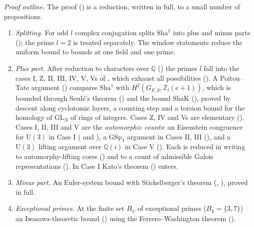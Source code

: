\documentclass[10pt]{amsart}
\theoremstyle{definition}
\theoremstyle{remark}
\newcommand{\Z}{\mathbb Z}
\newcommand{\Q}{\mathbb Q}
\begin{document}
\emph{Proof outline.} The proof (\cite[\S\S\ref{A-i5:ssec-assembly}--\ref{A-i5:ssec-proof}]{Annex})
is a reduction, written in full, to a small number of propositions.
\begin{enumerate}
\item \emph{Splitting.} For odd $l$ complex conjugation splits
$\mathrm{Sha}^1$ into plus and minus parts
(\cite[Lemma~\ref{A-i5:lem-split}]{Annex}); the prime $l=2$ is treated
separately. The window statements reduce the uniform bound to bounds at one
field and one prime.
\item \emph{Plus part.} After reduction to characters over $\Q$
(\cite[\S\ref{A-i5:ssec-red}]{Annex}) the primes $l$ fall into the cases I,
Z, II, III, IV, V, Vs of \cite[Definition~\ref{A-i5:def-cases}]{Annex},
which exhaust all possibilities
(\cite[Lemma~\ref{A-i5:lem-hostarith}]{Annex}). A Poitou--Tate argument
(\cite[Proposition~\ref{A-i5:prop-shaleV}]{Annex}) compares $\mathrm{Sha}^1$
with $H^2(G_{F,S},\Z_l(e+1))$, which is bounded through Soul\'e's theorem
(\cite[Theorem~\ref{A-i5:thm-soule}]{Annex}) and the bound
$\mathrm{ShaK}$ (\cite[Proposition~\ref{A-i5:prop-shak}]{Annex}), proved by
descent along cyclotomic layers, a counting step and a torsion bound for
the homology of $\mathrm{GL}_N$ of rings of integers. Cases Z, IV and Vs
are elementary (\cite[Propositions~\ref{A-i5:prop-countZ}, \ref{A-i5:prop-countIV},
\ref{A-i5:prop-countVs}]{Annex}). Cases I, II, III and V are the
\emph{automorphic counts}: an Eisenstein congruence for $\mathrm U(3)$ in
Case I (\cite[Theorem~\ref{A-i5:prop-corg}]{Annex} and
\cite[Proposition~\ref{A-i5:prop-countI}]{Annex}), a $\mathrm{GSp}_4$
argument in Cases II, III (\cite[Proposition~\ref{A-i5:prop-c23}]{Annex}), and
a $\mathrm U(3)$ lifting argument over $\Q(i)$ in Case V
(\cite[Proposition~\ref{A-i5:prop-c5}]{Annex}). Each is reduced in writing to
automorphy-lifting cores (\cite[\S\S\ref{A-i5:x5-ssec}, \ref{A-i5:x5-ssec-arch}]{Annex})
and to a count of admissible Galois representations
(\cite[Proposition~\ref{A-i5:x-prop:u3count}]{Annex}). In Case I Kato's
theorem (\cite[Theorem~\ref{A-i5:x-thm:kato}]{Annex}) enters.
\item \emph{Minus part.} An Euler-system bound with Stickelberger's
theorem (\cite[Theorem~\ref{A-i5:x-thm:thmbc}]{Annex},
\cite[Propositions~\ref{A-i5:prop-psibound} and~\ref{A-i5:prop-stick}]{Annex}),
proved in full.
\item \emph{Exceptional primes.} At the finite set $B_\psi$ of exceptional
primes ($B_{\mathbf 1}=\{3,7\}$) an Iwasawa-theoretic bound
(\cite[Proposition~\ref{A-i5:prop-thmbab}]{Annex}) using the
Ferrero--Washington theorem (\cite[Theorem~\ref{A-i5:thm-fw}]{Annex}).
\end{enumerate}
\end{document}

